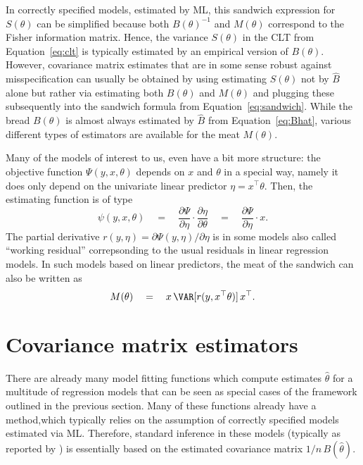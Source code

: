 \documentclass{Z}
\begin{document}
In correctly specified models, estimated by ML, this sandwich expression for
$S(\theta)$ can be simplified because both $B(\theta)^{-1}$ and $M(\theta)$ correspond
to the Fisher information matrix. Hence, the variance $S(\theta)$ in the CLT from Equation~\ref{eq:clt}
is typically estimated by an empirical version of $B(\theta)$.
However, covariance matrix estimates that
are in some sense robust against misspecification can usually be obtained by using estimating
$S(\theta)$ not by $\hat B$ alone but rather via estimating both $B(\theta)$ and $M(\theta)$
and plugging these subsequently into the sandwich formula from Equation~\ref{eq:sandwich}.
While the bread $B(\theta)$ is almost always estimated by $\hat B$ from Equation~\ref{eq:Bhat}, various
different types of estimators are available for the meat $M(\theta)$.

Many of the models of interest to us, even have a bit more structure: the objective function
$\Psi(y, x, \theta)$ depends on $x$ and $\theta$ in a special way, namely it does only
depend on the univariate linear predictor $\eta = x^\top \theta$. Then, the estimating function is of type
\[
  \psi(y, x, \theta)
    \quad = \quad \frac{\partial \Psi}{\partial \eta} \cdot \frac{\partial \eta}{\partial \theta}
    \quad = \quad \frac{\partial \Psi}{\partial \eta} \cdot x.
\]
The partial derivative $r(y, \eta) = \partial \Psi(y, \eta) / \partial \eta$ is in some models
also called ``working residual'' correpsonding to the usual residuals in linear regression models.
In such models based on linear predictors, the meat of the sandwich can also be written as
\begin{equation} \label{eq:meatHC}
  M(\theta) \quad = \quad x \, \VAR[ r(y, x^\top \theta) ] \, x^\top.
\end{equation}



\section{Covariance matrix estimators}

There are already many model fitting functions which compute estimates $\hat \theta$
for a multitude of regression models that can be seen as special cases of the framework
outlined in the previous section. Many of these functions already have a 
method,which typically relies on the assumption of correctly specified models estimated
via ML. Therefore, standard inference
in these models (typically as reported by ) is essentially based on the estimated
covariance matrix $1/n \, B(\hat \theta)$.
\end{document}
